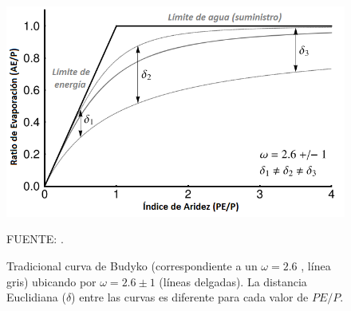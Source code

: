 \vspace{.25cm}
\begin{figure}[ht!]
\centering
	\includegraphics[scale=0.7]{Images/Greve2015_original_budyko.png}
	\caption{Tradicional curva de Budyko (correspondiente a un $\omega = 2.6$ \citep{Fu1981,Zhang2004}, línea gris) ubicando por $\omega = 2.6 \pm 1$ (líneas delgadas). La distancia Euclidiana ($\delta$) entre las curvas es diferente para cada valor de $PE/P$.}
	{\raggedright FUENTE: \citet{Greve2015}. \par}
	\label{fig:Greve01}
\end{figure}
